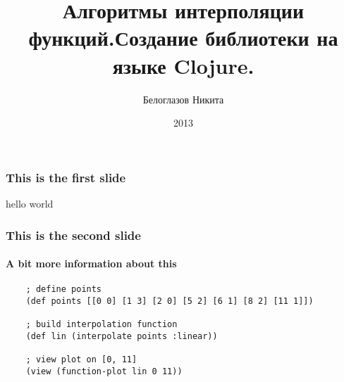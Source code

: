 \documentclass[russian]{beamer}
\title[Интерполяция]{Алгоритмы интерполяции функций.\newline Создание библиотеки на языке Clojure.}
\author{Белоглазов Никита}
\date{2013}
\institute{Белорусский Государственный Университет}
\begin{document}
\maketitle
\begin{frame}
  \frametitle{This is the first slide}
  hello
  \pause
  world
\end{frame}
\begin{frame}[fragile]
  \frametitle{This is the second slide}
  \framesubtitle{A bit more information about this}
  \begin{verbatim}
    ; define points
    (def points [[0 0] [1 3] [2 0] [5 2] [6 1] [8 2] [11 1]])

    ; build interpolation function
    (def lin (interpolate points :linear))

    ; view plot on [0, 11]
    (view (function-plot lin 0 11))
  \end{verbatim}
\end{frame}
\end{document}
